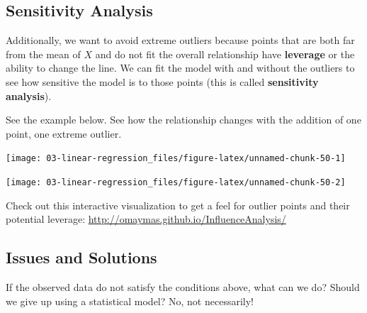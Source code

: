 \documentclass[
]{book}
\begin{document}
\hypertarget{sensitivity-analysis}{%
\subsection{Sensitivity Analysis}\label{sensitivity-analysis}}

Additionally, we want to avoid extreme outliers because points that are both far from the mean of \(X\) and do not fit the overall relationship have \textbf{leverage} or the ability to change the line. We can fit the model with and without the outliers to see how sensitive the model is to those points (this is called \textbf{sensitivity analysis}).

See the example below. See how the relationship changes with the addition of one point, one extreme outlier.

\begin{center}\texttt{[image: 03-linear-regression\_files/figure-latex/unnamed-chunk-50-1]} \end{center}

\begin{center}\texttt{[image: 03-linear-regression\_files/figure-latex/unnamed-chunk-50-2]} \end{center}

Check out this interactive visualization to get a feel for outlier points and their potential leverage: \url{http://omaymas.github.io/InfluenceAnalysis/}

\hypertarget{issues-and-solutions}{%
\subsection{Issues and Solutions}\label{issues-and-solutions}}

If the observed data do not satisfy the conditions above, what can we do? Should we give up using a statistical model? No, not necessarily!
\end{document}
